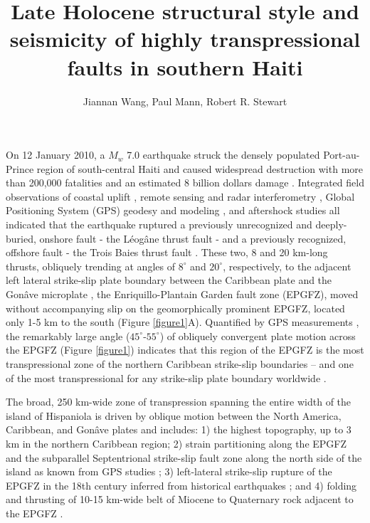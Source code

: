 \documentclass[man,natbib]{apa6}
\title{Late Holocene structural style and seismicity of highly transpressional faults in southern Haiti}
\author{Jiannan Wang, Paul Mann, Robert R. Stewart}
\affiliation{Department of Earth and Atmospheric Sciences, University of Houston, Houston, Texas, USA.}
\begin{document}
\maketitle


On 12 January 2010, a $M_w$ 7.0 earthquake struck the densely populated Port-au-Prince region of south-central Haiti and caused widespread destruction with more than 200,000 fatalities and an estimated 8 billion dollars damage  \citep{prentice2010seismic,kocel2016near}. 
Integrated field observations of coastal uplift  \citep{hayes2010complex,hashimoto2011fan}, remote sensing and radar interferometry  \citep{cowgill2012interactive}, Global Positioning System (GPS) geodesy and modeling \citep{calais2010transpressional,hayes2010complex,prentice2010seismic,symithe2013coseismic,douilly2013crustal,douilly2015three}, and aftershock studies \citep{calais2010transpressional,hayes2010complex,douilly2013crustal,douilly20163d} all indicated that the earthquake ruptured a previously unrecognized and deeply-buried, onshore fault - the L\'eog\^ane thrust fault - and a previously recognized, offshore fault - the Trois Baies thrust fault \citep{mercier20112010,symithe2013coseismic}. These two, 8 and 20 km-long thrusts, obliquely trending at angles of $8^{\circ}$ and $20^{\circ}$, respectively, to the adjacent left lateral strike-slip plate boundary between the Caribbean plate and the Gon\^ave microplate \citep{mann1995actively,calais2010transpressional,benford2012gps}, the Enriquillo-Plantain Garden fault zone (EPGFZ), moved without accompanying slip \citep{calais2010transpressional,hayes2010complex,prentice2010seismic} on the geomorphically prominent EPGFZ, located only 1-5 km to the south (Figure \ref{figure1}A). Quantified by GPS measurements \citep{calais2010transpressional}, the remarkably large angle ($45^{\circ}$-$55^{\circ}$) of obliquely convergent plate motion across the EPGFZ (Figure \ref{figure1}) indicates that this region of the EPGFZ is the most transpressional zone of the northern Caribbean strike-slip boundaries \citep{mann2002oblique} -- and one of the most transpressional for any strike-slip plate boundary worldwide \citep{mann2007overview}.  

The broad, 250 km-wide zone of transpression spanning the entire width of the island of Hispaniola is driven by oblique motion between the North America, Caribbean, and Gon\^ave plates and includes: 1) the highest topography, up to 3 km in the northern Caribbean region; 2) strain partitioning along the EPGFZ and the subparallel Septentrional strike-slip fault zone along the north side of the island as known from GPS studies \citep{calais2010transpressional,hayes2010complex,prentice2010seismic,symithe2013coseismic,douilly2013crustal,douilly2015three}; 3) left-lateral strike-slip rupture of the EPGFZ in the 18th century inferred from historical earthquakes \citep{prentice2010seismic}; and 4) folding and thrusting of 10-15 km-wide belt of Miocene to Quaternary rock adjacent to the EPGFZ \citep{saint2015seismotectonics}.
\end{document}
